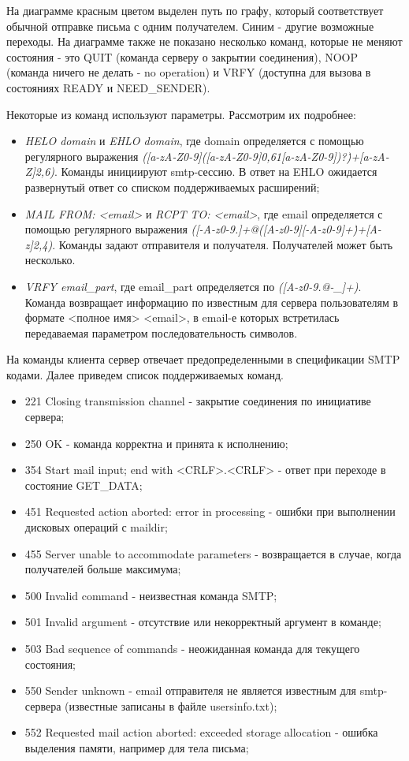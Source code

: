 \documentclass[a4paper,12pt]{report}
\begin{document}
На диаграмме красным цветом выделен путь по графу, который соответствует обычной отправке письма с одним получателем. Синим - другие возможные переходы. На диаграмме также не показано несколько команд, которые не меняют состояния - это QUIT (команда серверу о закрытии соединения), NOOP (команда ничего не делать - no operation) и VRFY (доступна для вызова в состояниях READY и NEED_SENDER).

Некоторые из команд используют параметры. Рассмотрим их подробнее:
\begin{itemize}
	\item \textit{HELO domain} и \textit{EHLO domain}, где domain определяется с помощью регулярного выражения \textit{([a-zA-Z0-9]([a-zA-Z0-9\-]{0,61}[a-zA-Z0-9])?\.)+[a-zA-Z]{2,6})}. Команды инициируют smtp-сессию. В ответ на EHLO ожидается развернутый ответ со списком поддерживаемых расширений;
	\item \textit{MAIL FROM: <email>} и \textit{RCPT TO: <email>}, где email определяется с помощью регулярного выражения \textit{([-A-z0-9.]+@([A-z0-9][-A-z0-9]+\.)+[A-z]{2,4})}. Команды задают отправителя и получателя. Получателей может быть несколько.
	\item \textit{VRFY email_part}, где email_part определяется по \textit{([A-z0-9.@-_]+)}. Команда возвращает информацию по известным для сервера пользователям в формате <полное имя> <email>, в email-е которых встретилась передаваемая параметром последовательность символов.
\end{itemize}

На команды клиента сервер отвечает предопределенными в спецификации SMTP кодами. Далее приведем список поддерживаемых команд.
\begin{itemize}
	\item 221 Closing transmission channel - закрытие соединения по инициативе сервера;
	\item 250 OK - команда корректна и принята к исполнению;
	\item 354 Start mail input; end with <CRLF>.<CRLF> - ответ при переходе в состояние GET_DATA;
	\item 451 Requested action aborted: error in processing - ошибки при выполнении дисковых операций с maildir;
	\item 455 Server unable to accommodate parameters - возвращается в случае, когда получателей больше максимума;
	\item 500 Invalid command - неизвестная команда SMTP;
	\item 501 Invalid argument - отсутствие или некорректный аргумент в команде;
	\item 503 Bad sequence of commands - неожиданная команда для текущего состояния;
	\item 550 Sender unknown - email отправителя не является известным для smtp-сервера (известные записаны в файле usersinfo.txt);
	\item 552 Requested mail action aborted: exceeded storage allocation - ошибка выделения памяти, например для тела письма;
\end{itemize}
\end{document}
